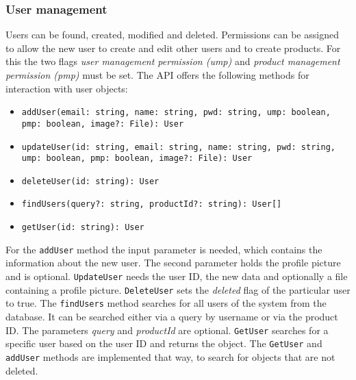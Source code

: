     \subsubsection*{User management}
    Users can be found, created, modified and deleted. Permissions can be assigned to allow the new user to create and edit other users and to create products. For this the two flags \textit{user management permission (ump)} and \textit{product management permission (pmp)} must be set. The API offers the following methods for interaction with user objects:
    \begin{itemize} 
        \item \texttt{addUser(email: string, name: string, pwd: string, ump: boolean, pmp: boolean, image?: File): User}
        \item \texttt{updateUser(id: string, email: string, name: string, pwd: string, ump: boolean, pmp: boolean, image?: File): User}
        \item \texttt{deleteUser(id: string): User}
        \item \texttt{findUsers(query?: string, productId?: string): User[]}
        \item \texttt{getUser(id: string): User}
    \end{itemize}
     For the \texttt{addUser} method the input parameter is needed, which contains the information about the new user. The second parameter holds the profile picture and is optional.  \texttt{UpdateUser} needs the user ID, the new data and optionally a file containing a profile picture. \texttt{DeleteUser} sets the \textit{deleted} flag of the particular user to true. 
     The \texttt{findUsers} method searches for all users of the system from the database. It can be searched either via a query by username or via the product ID. The parameters \textit{query} and \textit{productId} are optional.
     \texttt{GetUser} searches for a specific user based on the user ID and returns the object.
     The \texttt{GetUser} and \texttt{addUser} methods are implemented that way, to search for objects that are not deleted.

